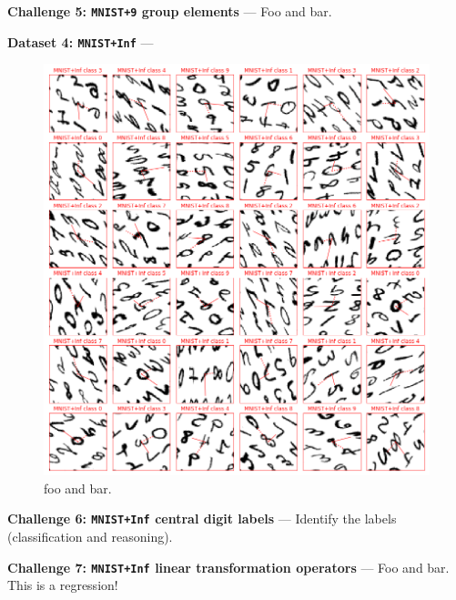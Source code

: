 \documentclass{article}
\renewcommand{\paragraph}[1]{\par\medskip\noindent\textbf{#1} ---}
\begin{document}
\paragraph{Challenge 5: \texttt{MNIST+9} group elements}
Foo and bar.

\paragraph{Dataset 4: \texttt{MNIST+Inf}}

\begin{figure}[t!]
\includegraphics[width=\textwidth]{../notebooks/MNIST+Inf.png}
\caption{foo and bar.\label{fig:Inf}}
\end{figure}

\paragraph{Challenge 6: \texttt{MNIST+Inf} central digit labels}
Identify the labels (classification and reasoning).

\paragraph{Challenge 7: \texttt{MNIST+Inf} linear transformation operators}
Foo and bar. This is a regression!
\end{document}
